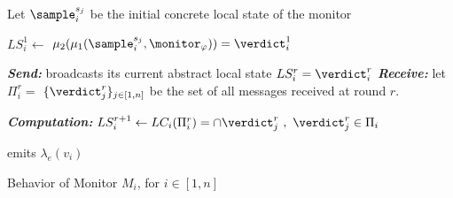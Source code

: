 
\begin{algorithm}[H]

\small
{}
\DontPrintSemicolon
Let $\sample_i^{s_j}$ be the initial concrete local state of the monitor  

$LS_i^1 \gets$ $\mu_2 (  \mu_1(\sample_i^{s_j}, \monitor_\varphi)) = \verdict_i^1$   \label{line:init3}

  {   
{\em \textbf{Send:}}  broadcasts its current abstract local state $LS_i^r = \verdict_i^r$ 
\label{line:send3} 
{\em \textbf{Receive:}} let $\Pi_i^r =$ $\{ \verdict_j^r\}_{j \in [1, n]}$ be the set of all messages received at round $r$. 

{\it \textbf{Computation:}}  $LS_i^{r+1} \gets LC_i(\Pi_i^r) = \cap \verdict_j^r ~,~  {\verdict_j^r \in \Pi_i}$  \label{line:computation3} 

}
emits $\lambda_e(v_i)$  
\label{line:emit3}
\caption{Behavior of Monitor $M_i$, for $i\in [1, n]$}
\label{alg:localmonalgo3}
 \end{algorithm}










